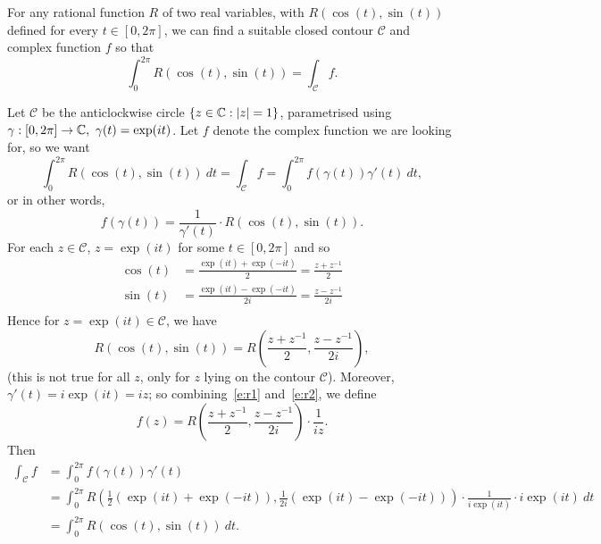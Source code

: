 \begin{example}
\label{e:trig2}
For any rational function $R$ of two real variables, with $R(\cos(t),\sin(t))$ defined for every $t \in [0,2\pi]$, we can find a suitable closed contour $\mathcal{C}$ and complex function $f$ so that
\[
\int_0^{2\pi} R ( \cos(t), \sin (t) ) = \int_{\mathcal{C}} f.
\]
\begin{blankbox}
Let $\mathcal{C}$ be the anticlockwise circle $\left\{z \in \mathbb{C}: \left| z \right|=1\right\}$, parametrised using $\gamma:[0,2\pi] \to \mathbb{C},\ \gamma(t) = \exp(it)$. Let $f$ denote the complex function we are looking for, so we want
\[
\int_0^{2\pi} R ( \cos(t),\sin(t) ) \ dt = \int_{\mathcal{C}} f = \int_0^{2\pi} f \left( \gamma (t) \right) \gamma' (t)\ dt,
\]
or in other words,
\begin{equation}
\tag{R1}\label{e:r1}
f( \gamma(t) ) = \frac{1}{\gamma'(t)} \cdot R( \cos(t), \sin (t) ).
\end{equation}
For each $z \in \mathcal{C}$, $z= \exp(it)$ for some $t \in [0,2\pi]$ and so
\begin{align*}
\cos(t) & = \frac{\exp(it)+\exp(-it)}{2}  = \frac{z+z^{-1}}{2} \\
\sin(t) & = \frac{\exp(it)-\exp(-it)}{2i} =  \frac{z-z^{-1}}{2i} \\
\end{align*}
Hence for $z=\exp (it) \in \mathcal{C}$, we have
\begin{equation}
\tag{R2}\label{e:r2}
 R ( \cos (t), \sin (t) )  = R \left( \frac{z+z^{-1}}{2}, \frac{z-z^{-1}}{2i} \right), 
 \end{equation}
(this is not true for all $z$, only for $z$ lying on the contour $\mathcal{C}$). Moreover, $\gamma'(t) = i \exp (it) = iz$; so combining~\eqref{e:r1} and~\eqref{e:r2}, we define
\[
f(z) = R \left( \frac{z+z^{-1}}{2}, \frac{z-z^{-1}}{2i} \right) \cdot \frac{1}{iz}.
\]
Then
\begin{align*}
\int_{\mathcal{C}} f & = \int_0^{2\pi} f( \gamma(t)) \gamma'(t) \\
& = \int_0^{2\pi} R \left( \tfrac{1}{2}(\exp(it)+\exp(-it)),\tfrac{1}{2i}(\exp(it)-\exp(-it)) \right) \cdot \frac{1}{i\exp(it)} \cdot i\exp(it)\ dt \\
&= \int_0^{2\pi} R( \cos (t) , \sin (t))\ dt.
\end{align*}
\end{blankbox}
\end{example}
